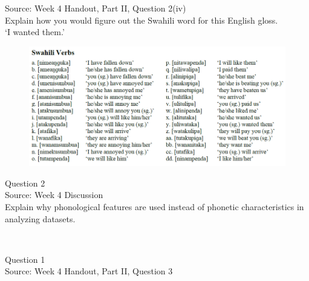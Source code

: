 \documentclass[12pt]{article}
\begin{document}
Source: Week 4 Handout, Part II, Question 2(iv)\\

Explain how you would figure out the Swahili word for this English gloss.\\

‘I wanted them.’

\begin{figure}[H]
\includegraphics{../images/swahiliverbs.png}
\end{figure}

\newpage

{\large Question 2}\\

Source: Week 4 Discussion\\

Explain why phonological features are used instead of phonetic characteristics in analyzing datasets.\\


\newpage

\begin{center}
\textbf{{\color{red}{\HUGE END OF EXAM}}}\\

\end{center}
\newpage

\begin{center}
\textbf{{\color{blue}{\HUGE START OF EXAM\\}}}

\textbf{{\color{blue}{\HUGE Student ID: 51697\\}}}

\textbf{{\color{blue}{\HUGE 9:30\\}}}

\end{center}
\newpage

{\large Question 1}\\

Source: Week 4 Handout, Part II, Question 3\\
\end{document}
